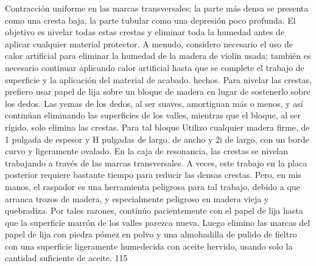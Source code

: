 Contracción uniforme en las marcas transversales; la parte más densa se presenta como una cresta baja, la parte tubular como una depresión poco profunda. El objetivo es nivelar todas estas crestas y eliminar toda la humedad antes de aplicar cualquier material protector. A menudo, considero necesario el uso de calor artificial para eliminar la humedad de la madera de violín usada; también es necesario continuar aplicando calor artificial hasta que se complete el trabajo de superficie y la aplicación del material de acabado.
hechos.
Para nivelar las crestas, prefiero usar papel de lija sobre un bloque de madera en lugar de sostenerlo sobre los dedos. Las yemas de los dedos, al ser suaves, amortiguan más o menos, y así continúan eliminando las superficies de los valles, mientras que el bloque, al ser rígido, solo elimina las crestas. Para tal bloque
Utilizo cualquier madera firme, de 1 pulgada de espesor y H pulgadas de largo.
de ancho y 2i de largo, con un borde curvo y ligeramente ovalado. En la caja de resonancia, las crestas se nivelan trabajando a través de las marcas transversales. A veces, este trabajo en la placa posterior requiere bastante tiempo para reducir las densas crestas. Pero, en mis manos, el raspador es una herramienta peligrosa para tal trabajo, debido a que arranca trozos de madera, y especialmente peligroso en madera vieja y quebradiza. Por tales razones, continúo pacientemente con el papel de lija hasta que la superficie marrón de los valles parezca nueva. Luego elimino las marcas del papel de lija con piedra pómez en polvo y una almohadilla de pulido de fieltro con una superficie ligeramente humedecida con aceite hervido, usando solo la cantidad suficiente de aceite.
115

